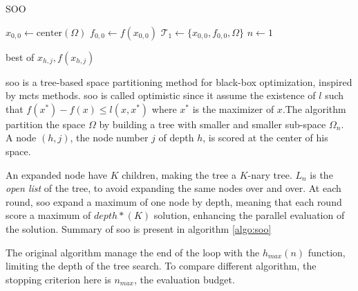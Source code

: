 \begin{algorithm}[h]
    \caption{SOO}
    \label{algo:soo}
    
    $x_{0,0} \gets \text{center}(\Omega)$ \;
    $f_{0,0} \gets f(x_{0,0})$ \;
    $\mathcal{T}_1 \gets \{x_{0,0}, f_{0,0}, \Omega\}$ \;
    $n \gets 1$ \;
    
    \Return best of $x_{h,j}, f(x_{h,j})$ \;
    \end{algorithm}
    

\acrshort{soo} is a tree-based space partitioning method for black-box optimization, inspired by \acrfull{mcts} methods. \acrshort{soo} is called optimistic since it assume the existence of $ l$ such that $f(x^*)-f(x) \leq l(x,x^*)$ where $x^*$ is the maximizer of $x$.The algorithm partition the space $\Omega$ by building a tree with smaller and smaller sub-space $\Omega_n$. A node $(h,j)$, the node number $j$ of depth $h$, is scored at the center of his space. 

An expanded node have $K$ children, making the tree a $K$-nary tree. $L_n$ is the \textit{open list} of the tree, to avoid expanding the same nodes over and over. At each round, \acrshort{soo} expand a maximum of one node by depth, meaning that each round score a maximum of $depth*(K)$ solution, enhancing the parallel evaluation of the solution. Summary of \acrshort{soo} is present in algorithm \ref{algo:soo}

The original algorithm manage the end of the loop with the $h_{max}(n)$ function, limiting the depth of the tree search. To compare different algorithm, the stopping criterion here is $n_{max}$, the evaluation budget. 

